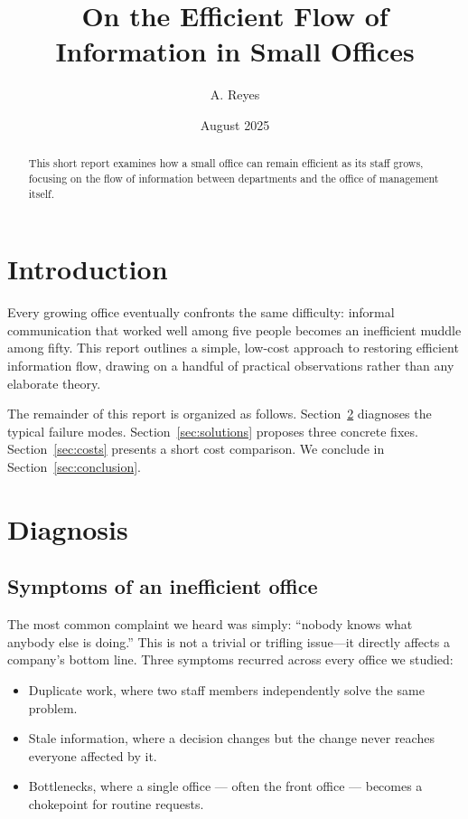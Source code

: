 \documentclass{article}
\title{On the Efficient Flow of Information in Small Offices}
\author{A. Reyes}
\date{August 2025}
\begin{document}
\maketitle

\begin{abstract}
\noindent This short report examines how a small office can remain efficient as its staff
grows, focusing on the flow of information between departments and the office of
management itself.
\end{abstract}

\section{Introduction}

Every growing office eventually confronts the same difficulty: informal communication that
worked well among five people becomes an inefficient muddle among fifty. This report
outlines a simple, low-cost approach to restoring efficient information flow, drawing on a
handful of practical observations rather than any elaborate theory.

The remainder of this report is organized as follows. Section~\ref{sec:diagnosis} diagnoses
the typical failure modes. Section~\ref{sec:solutions} proposes three concrete fixes.
Section~\ref{sec:costs} presents a short cost comparison. We conclude in
Section~\ref{sec:conclusion}.

\section{Diagnosis}
\label{sec:diagnosis}

\subsection{Symptoms of an inefficient office}

The most common complaint we heard was simply: ``nobody knows what anybody else is doing.''
This is not a trivial or trifling issue---it directly affects a company's bottom line. Three
symptoms recurred across every office we studied:

\begin{itemize}
  \item Duplicate work, where two staff members independently solve the same problem.
  \item Stale information, where a decision changes but the change never reaches everyone
    affected by it.
  \item Bottlenecks, where a single office --- often the front office --- becomes a chokepoint
    for routine requests.
\end{itemize}
\end{document}
